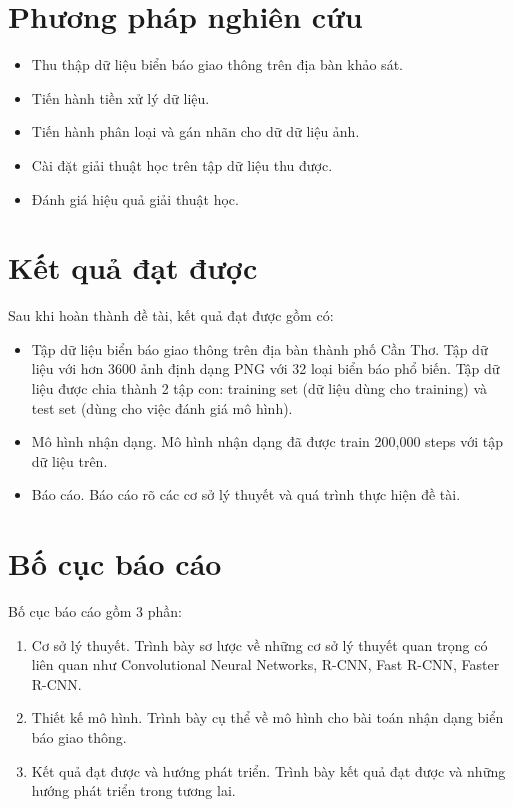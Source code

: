 \documentclass[../thesis.tex]{subfiles}
\begin{document}
\section{Phương pháp nghiên cứu}

\begin{itemize}
  \item Thu thập dữ liệu biển báo giao thông trên địa bàn khảo sát.
  \item Tiến hành tiền xử lý dữ liệu.
  \item Tiến hành phân loại và gán nhãn cho dữ dữ liệu ảnh.
  \item Cài đặt giải thuật học trên tập dữ liệu thu được.
  \item Đánh giá hiệu quả giải thuật học.
\end{itemize}

\section{Kết quả đạt được}

Sau khi hoàn thành đề tài, kết quả đạt được gồm có:

\begin{itemize}
  \item Tập dữ liệu biển báo giao thông trên địa bàn thành phố Cần Thơ. Tập dữ liệu với hơn 3600 ảnh định dạng PNG với 32 loại biển báo phổ biến. Tập dữ liệu được chia thành 2 tập con: training set (dữ liệu dùng cho training) và test set (dùng cho việc đánh giá mô hình).
  \item Mô hình nhận dạng. Mô hình nhận dạng đã được train 200,000 steps với tập dữ liệu trên.
  \item Báo cáo. Báo cáo rõ các cơ sở lý thuyết và quá trình thực hiện đề tài.
\end{itemize}

\section{Bố cục báo cáo}

Bố cục báo cáo gồm 3 phần:

\begin{enumerate}
  \item Cơ sở lý thuyết. Trình bày sơ lược về những cơ sở lý thuyết quan trọng có liên quan như Convolutional Neural Networks, R-CNN, Fast R-CNN, Faster R-CNN.
  \item Thiết kế mô hình. Trình bày cụ thể về mô hình cho bài toán nhận dạng biển báo giao thông.
  \item Kết quả đạt được và hướng phát triển. Trình bày kết quả đạt được và những hướng phát triển trong tương lai.
\end{enumerate}
\end{document}
